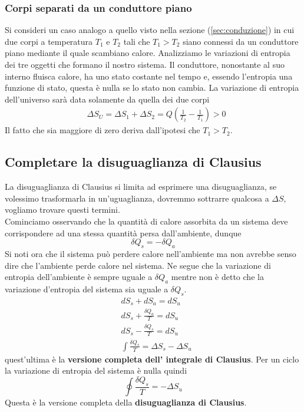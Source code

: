 \documentclass[10pt,a4paper]{article}
\begin{document}
\subsubsection*{Corpi separati da un conduttore piano}
Si consideri un caso analogo a quello visto nella sezione (\ref{sec:conduzione}) in cui due corpi a temperatura \(T_1\) e \(T_2\) tali che \(T_1 > T_2\) siano connessi da un conduttore piano mediante il quale scambiano calore. Analizziamo le variazioni di entropia dei tre oggetti che formano il nostro sistema. Il conduttore, nonostante al suo interno fluisca calore, ha uno stato costante nel tempo e, essendo l'entropia una funzione di stato, questa è nulla se lo stato non cambia. La variazione di entropia dell'universo sarà data solamente da quella dei due corpi 
\begin{align*}
	&\Delta S_U = \Delta S_1 + \Delta S_2 = Q\left(\frac{1}{T_2}-\frac{1}{T_1}\right)>0
\end{align*}
Il fatto che sia maggiore di zero deriva dall'ipotesi che \(T_1 > T_2\).

\subsection{Completare la disuguaglianza di Clausius}
La disuguaglianza di Clausius si limita ad esprimere una disuguaglianza, se volessimo trasformarla in un'uguaglianza, dovremmo sottrarre qualcosa a \(\Delta S\), vogliamo trovare questi termini.\\
Cominciamo osservando che la quantità di calore assorbita da un sistema deve corrispondere ad una stessa quantità persa dall'ambiente, dunque
\[\delta Q_s = -\delta Q_a\]
Si noti ora che il sistema può perdere calore nell'ambiente ma non avrebbe senso dire che l'ambiente perde calore nel sistema. Ne segue che la variazione di entropia dell'ambiente è sempre uguale a \(\delta Q_a\) mentre non è detto che la variazione d'entropia del sistema sia uguale a \(\delta Q_s\). 
\begin{align*}
	&dS_s + dS_a = dS_u\\
	&dS_s + \frac{\delta Q_a}{T} = dS_u\\
	&dS_s - \frac{\delta Q_s}{T} =dS_u\\
	&\int\frac{\delta Q_s}{T} = \Delta S_s - \Delta S_u
\end{align*}
quest'ultima è la \textbf{versione completa dell' integrale di Clausius}. Per un ciclo la variazione di entropia del sistema è nulla quindi
\[\oint \frac{\delta Q_s}{T} = -\Delta S_u\]
Questa è la versione completa della \textbf{disuguaglianza di Clausius}.
\end{document}
